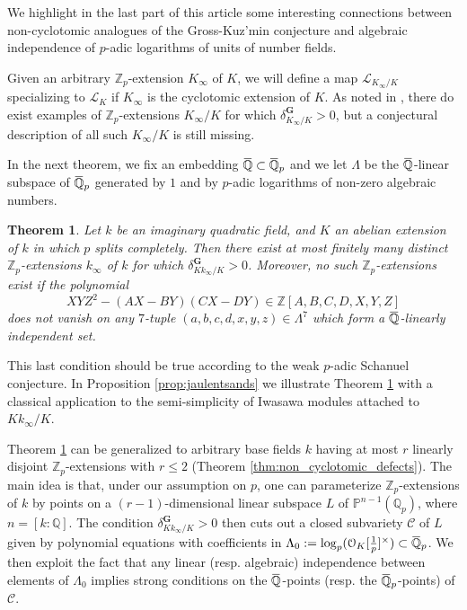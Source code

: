 \documentclass[12pt]{amsart}
\newcommand{\Q}{\mathbb{Q}}
\newcommand\bZ{\mathbb{Z}}
\newcommand\bQ{\mathbb{Q}}
\newcommand\bP{\mathbb{P}}
\newcommand\Zp{{\mathbb{Z}_p}}
\newcommand\Qp{{\mathbb{Q}_p}}
\newcommand\cO{\mathcal{O}}
\newcommand\sC{\mathscr{C}}
\newcommand\sL{\mathscr{L}}
\newcommand{\ob}[1]{\mkern 1.5mu\overline{\mkern-1.5mu#1\mkern-1.5mu}\mkern 1.5mu}
\theoremstyle{defstyle}
\theoremstyle{thmstyle}
\newtheorem{THM}[subsection]{Theorem}
\begin{document}
	We highlight in the last part of this article some interesting connections between non-cyclotomic analogues of the Gross-Kuz'min conjecture and algebraic independence of $p$-adic logarithms of units of number fields. 
	
	Given an arbitrary $\Zp$-extension $K_\infty$ of $K$, we will define a map $\sL_{K_\infty/K}$ specializing to $\sL_K$ if $K_\infty$ is the cyclotomic extension of $K$. As noted in \cite{kisilevsky,jaulentsands}, there do exist examples of $\Zp$-extensions $K_\infty/K$ for which $\delta_{K_\infty/K}^\textbf{G}>0$, but a conjectural description of all such $K_\infty/K$ is still missing.
	
	In the next theorem, we fix an embedding $\ob{\bQ}\subset \ob{\bQ}_p$ and we let $\Lambda$ be the $\ob{\bQ}$-linear subspace of $ \ob{\bQ}_p$ generated by $1$ and by $p$-adic logarithms of non-zero algebraic numbers.
	
	\begin{THM}\label{THM:non-cyclotomic_gk}
		Let $k$ be an imaginary quadratic field, and $K$ an abelian extension of $k$ in which $p$ splits completely. 
		Then there exist at most finitely many distinct $\Zp$-extensions $k_\infty$ of $k$ for which $\delta_{Kk_\infty/K}^\textbf{G}>0$. Moreover, no such $\Zp$-extensions exist if the polynomial 
		\[XYZ^2-(AX-BY)(CX-DY)\in\bZ[A,B,C,D,X,Y,Z]\]
		does not vanish on any $7$-tuple $(a,b,c,d,x,y,z)\in\Lambda^7$ which form a $\ob{\bQ}$-linearly independent set.
	\end{THM}
	This last condition should be true according to the weak $p$-adic Schanuel conjecture. In Proposition \ref{prop:jaulentsands} we illustrate Theorem \ref{THM:non-cyclotomic_gk} with a classical application to the semi-simplicity of Iwasawa modules attached to $Kk_\infty/K$. 
	
	Theorem \ref{THM:non-cyclotomic_gk} can be generalized to arbitrary base fields $k$ having at most $r$ linearly disjoint $\Zp$-extensions with $r\leq 2$ (Theorem \ref{thm:non_cyclotomic_defects}). The main idea is that, under our assumption on $p$, one can parameterize $\Zp$-extensions of $k$ by points on a $(r-1)$-dimensional linear subspace $L$ of $\bP^{n-1}(\Qp)$, where $n=[k:\Q]$. The condition $\delta_{Kk_\infty/K}^\textbf{G}>0$ then cuts out a closed subvariety $\sC$ of $L$ given by polynomial equations with coefficients in $\Lambda_0:=\log_p(\cO_K[\tfrac{1}{p}]^\times)\subset \ob{\bQ}_p$. We then exploit the fact that any linear (resp. algebraic) independence between elements of $\Lambda_0$ implies strong conditions on the $\ob{\Q}$-points (resp. the $\ob{\Q}_p$-points) of $\sC$.
	
\end{document}
